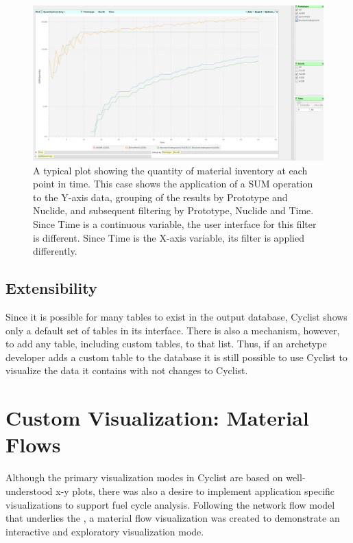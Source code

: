 \begin{figure}[htbp]
  \centering
  \includegraphics[width=\columnwidth]{./images/plot-01-07}
  \caption{A typical plot showing the quantity of material inventory at each
    point in time.  This case shows the application of a SUM operation to the
    Y-axis data, grouping of the results by Prototype and Nuclide, and
    subsequent filtering by Prototype, Nuclide and Time.  Since Time is a
    continuous variable, the user interface for this filter is different.  Since
    Time is the X-axis variable, its filter is applied differently.  }
  \label{fig:plot-01-07}
\end{figure}

\subsection{Extensibility}

Since it is possible for many tables to exist in the \Cyclus output database,
Cyclist shows only a default set of tables in its interface.  There is also a
mechanism, however, to add any table, including custom tables, to that list.
Thus, if an archetype developer adds a custom table to the database it is
still possible to use Cyclist to visualize the data it contains with not
changes to Cyclist.

\section{Custom Visualization: Material Flows}

Although the primary visualization modes in Cyclist are based on
well-understood x-y plots, there was also a desire to implement application
specific visualizations to support fuel cycle analysis.  Following the network
flow model that underlies the \Cyclus, a material flow visualization was
created to demonstrate an interactive and exploratory visualization mode.

